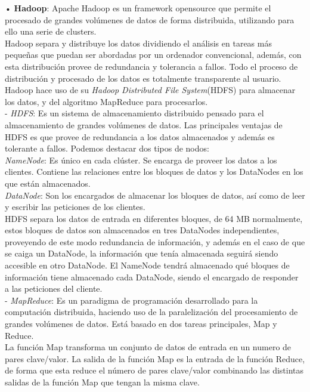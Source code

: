 •	\textbf{Hadoop}: Apache Hadoop es un framework opensource que permite el procesado de grandes volúmenes de datos de forma distribuida, utilizando para ello una serie de clusters.\\

Hadoop separa y distribuye los datos dividiendo el análisis en tareas más pequeñas que puedan ser abordadas por un ordenador convencional, además, con esta distribución provee de  redundancia y tolerancia a fallos. Todo el proceso de distribución y procesado de los datos es totalmente transparente al usuario. Hadoop hace uso de su \emph{Hadoop Distributed File System}(HDFS) para almacenar los datos, y del algoritmo MapReduce para procesarlos.\\ 

-	\emph{HDFS}: Es un sistema de almacenamiento distribuido pensado para el almacenamiento de grandes volúmenes de datos. Las principales ventajas de HDFS es que provee de redundancia a los datos almacenados y además es tolerante a fallos. Podemos destacar dos tipos de nodos:\\

	\emph{NameNode}: Es único en cada clúster. Se encarga de proveer los datos a los clientes. Contiene las relaciones entre los bloques de datos y los DataNodes en los que están almacenados.\\
	
	\emph{DataNode}: Son los encargados de almacenar los bloques de datos, así como de leer y escribir las peticiones de los clientes.\\
	
	HDFS separa los datos de entrada en diferentes bloques, de 64 MB normalmente, estos bloques de datos son almacenados en tres DataNodes independientes, proveyendo de este modo redundancia de información, y además en el caso de que se caiga un DataNode, la información que tenía almacenada seguirá siendo accesible en otro DataNode. El NameNode tendrá almacenado qué bloques de información tiene almacenado cada DataNode, siendo el encargado de responder a las peticiones del cliente.\\
	
-	\emph{MapReduce}: Es un paradigma de programación desarrollado para la computación distribuida, haciendo uso de la paralelización del procesamiento de grandes volúmenes de datos. Está basado en dos tareas principales, Map y Reduce.\\

La función Map transforma un conjunto de datos de entrada en un numero de pares clave/valor. La salida de la función Map es la entrada de la función Reduce, de forma que esta reduce el número de pares clave/valor combinando las distintas salidas de la función Map que tengan la misma clave.\\

